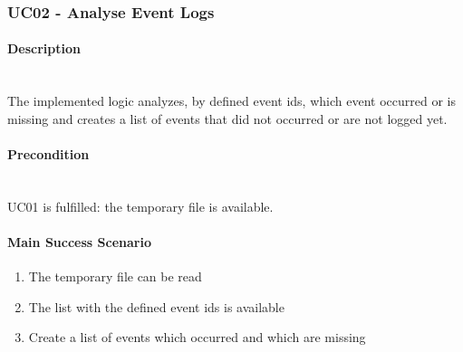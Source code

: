 \subsubsection{UC02 - Analyse Event Logs}
\begin{tcolorbox}
    \paragraph{Description} \ \\
    The implemented logic analyzes, by defined event ids, which event occurred or is missing and creates a list of events that did not occurred or are not logged yet.
    \ \\
    \paragraph{Precondition} \ \\
    UC01 is fulfilled: the temporary file is available.
    \ \\
    \paragraph{Main Success Scenario} 
    \begin{enumerate}
        \item The temporary file can be read
        \item The list with the defined event ids is available
        \item Create a list of events which occurred and which are missing
    \end{enumerate}   
\end{tcolorbox}



